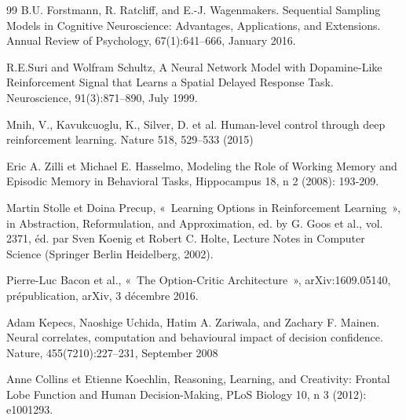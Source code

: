 \documentclass[10pt, a4paper]{collection-edmi}
\begin{document}
\begin{content}
\begin{thebibliography}{99}
B.U. Forstmann, R. Ratcliff, and E.-J. Wagenmakers. Sequential Sampling Models in Cognitive Neuroscience: Advantages, Applications, and Extensions. Annual Review of Psychology, 67(1):641–666, January 2016.

R.E.Suri and Wolfram Schultz, A Neural Network Model with Dopamine-Like Reinforcement Signal that Learns a Spatial Delayed Response Task. Neuroscience, 91(3):871–890, July 1999.

Mnih, V., Kavukcuoglu, K., Silver, D. et al. Human-level control through deep reinforcement learning. Nature 518, 529–533 (2015)

Eric A. Zilli et Michael E. Hasselmo, Modeling the Role of Working Memory and Episodic Memory in Behavioral Tasks, Hippocampus 18, n 2 (2008): 193‑209.

Martin Stolle et Doina Precup, « Learning Options in Reinforcement Learning », in Abstraction, Reformulation, and Approximation, ed. by G. Goos et al., vol. 2371, éd. par Sven Koenig et Robert C. Holte, Lecture Notes in Computer Science (Springer Berlin Heidelberg, 2002).

Pierre-Luc Bacon et al., « The Option-Critic Architecture », arXiv:1609.05140, prépublication, arXiv, 3 décembre 2016.

Adam Kepecs, Naoshige Uchida, Hatim A. Zariwala, and Zachary F. Mainen. Neural correlates, computation and behavioural impact of decision confidence. Nature, 455(7210):227–231, September 2008

Anne Collins et Etienne Koechlin, Reasoning, Learning, and Creativity: Frontal Lobe Function and Human Decision-Making, PLoS Biology 10, n 3 (2012): e1001293.

\end{thebibliography}
\end{content}
\end{document}
